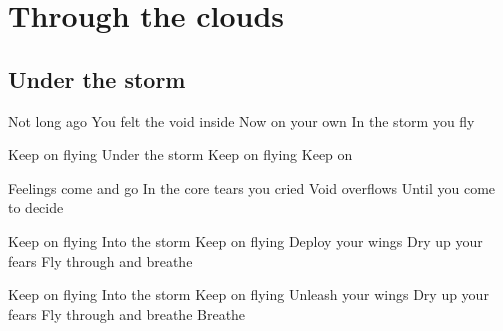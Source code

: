 \documentclass{article}
\newenvironment{album}[1]%
{%
  \section*{#1}
}%
{%
}
\newenvironment{song}[1]%
{%
  \subsection*{\textbf{#1}}
  \begin{multicols*}{2}
}%
{%
  \end{multicols*}
  \newpage
}
\newenvironment{couplet} %
{%
  \verbatim
}%
{% end code
  \endverbatim
}
\newenvironment{refrain} %
{%
  \verbatim
}%
{% end code
  \endverbatim
}
\begin{document}
\begin{album}{Through the clouds}
\begin{song}{Under the storm}
\begin{couplet}
Not long ago
You felt the void inside
Now on your own
In the storm you fly
\end{couplet}
\begin{refrain}
Keep on flying
Under the storm
Keep on flying
Keep on
\end{refrain}
\begin{couplet}
Feelings come and go
In the core tears you cried
Void overflows
Until you come to decide
\end{couplet}
\begin{refrain}
Keep on flying
Into the storm
Keep on flying
Deploy your wings
Dry up your fears
Fly through and breathe
\end{refrain}
\begin{refrain}
Keep on flying
Into the storm
Keep on flying
Unleash your wings
Dry up your fears
Fly through and breathe
Breathe
\end{refrain}
\end{song}


\end{album}
\end{document}
